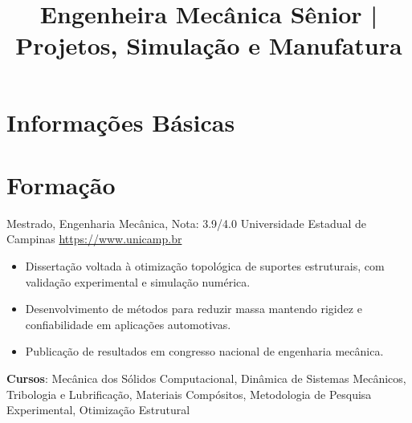 \documentclass[a4paper, serif, 10pt]{moderncv}
\title{Engenheira Mecânica Sênior | Projetos, Simulação e Manufatura}
\begin{document}
\maketitle

\section{Informações Básicas}

\section{Formação}

        {Mestrado, Engenharia Mecânica, Nota: 3.9/4.0}
        {Universidade Estadual de Campinas}
        {\url{https://www.unicamp.br}}
        {}
        {\begin{itemize}
\item Dissertação voltada à otimização topológica de suportes estruturais, com validação experimental e simulação numérica.
\item Desenvolvimento de métodos para reduzir massa mantendo rigidez e confiabilidade em aplicações automotivas.
\item Publicação de resultados em congresso nacional de engenharia mecânica.
\end{itemize}
\textbf{Cursos}: Mecânica dos Sólidos Computacional, Dinâmica de Sistemas Mecânicos, Tribologia e Lubrificação, Materiais Compósitos, Metodologia de Pesquisa Experimental, Otimização Estrutural}
\end{document}
